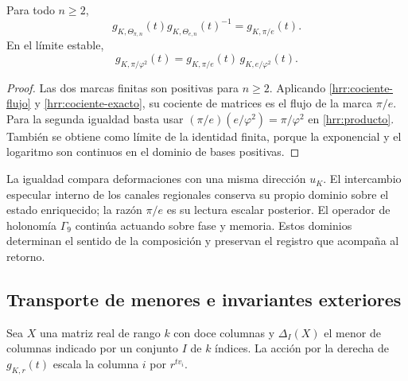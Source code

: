 \begin{corollary}
\label{hrr:composicion}
Para todo \(n\geq2\),
\begin{equation}
 g_{K,\Theta_{\pi,n}}(t)
 g_{K,\Theta_{e,n}}(t)^{-1}
 =g_{K,\pi/e}(t).
 \label{hrr:composicion-finita}
\end{equation}
En el límite estable,
\begin{equation}
 g_{K,\pi/\varphi^2}(t)
 =g_{K,\pi/e}(t)\,g_{K,e/\varphi^2}(t).
 \label{hrr:composicion-limite}
\end{equation}
\end{corollary}
\begin{proof}
Las dos marcas finitas son positivas para \(n\geq2\). Aplicando
\eqref{hrr:cociente-flujo} y \eqref{hrr:cociente-exacto}, su cociente
de matrices es el flujo de la marca \(\pi/e\). Para la segunda
igualdad basta usar
\((\pi/e)(e/\varphi^2)=\pi/\varphi^2\) en
\eqref{hrr:producto}. También se obtiene como límite de la identidad
finita, porque la exponencial y el logaritmo son continuos en el
dominio de bases positivas.
\end{proof}

La igualdad compara deformaciones con una misma dirección \(u_K\).
El intercambio especular interno de los canales regionales conserva
su propio dominio sobre el estado enriquecido; la razón \(\pi/e\)
es su lectura escalar posterior. El operador de holonomía \(\Gamma_9\)
continúa actuando sobre fase y memoria. Estos dominios determinan el
sentido de la composición y preservan el registro que acompaña al retorno.

\subsection{Transporte de menores e invariantes exteriores}

Sea \(X\) una matriz real de rango \(k\) con doce columnas y
\(\Delta_I(X)\) el menor de columnas indicado por un conjunto
\(I\) de \(k\) índices. La acción por la derecha de
\(g_{K,r}(t)\) escala la columna \(i\) por \(r^{tv_i}\).

